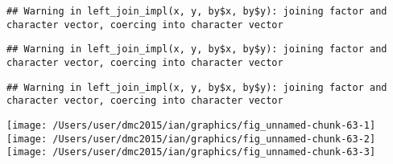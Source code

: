 \documentclass[10pt]{report}
\newenvironment{Shaded}{}{}
\newcommand{\KeywordTok}[1]{\textcolor[rgb]{0.00,0.44,0.13}{\textbf{{#1}}}}
\newcommand{\DataTypeTok}[1]{\textcolor[rgb]{0.56,0.13,0.00}{{#1}}}
\newcommand{\StringTok}[1]{\textcolor[rgb]{0.25,0.44,0.63}{{#1}}}
\newcommand{\NormalTok}[1]{{#1}}
\begin{document}
\begin{verbatim}
## Warning in left_join_impl(x, y, by$x, by$y): joining factor and character vector, coercing into character vector
\end{verbatim}

\begin{Shaded}
\end{Shaded}

\begin{verbatim}
## Warning in left_join_impl(x, y, by$x, by$y): joining factor and character vector, coercing into character vector
\end{verbatim}

\begin{verbatim}
## Warning in left_join_impl(x, y, by$x, by$y): joining factor and character vector, coercing into character vector
\end{verbatim}

\begin{Shaded}
\end{Shaded}

\begin{center}\texttt{[image: /Users/user/dmc2015/ian/graphics/fig\_unnamed-chunk-63-1]} \texttt{[image: /Users/user/dmc2015/ian/graphics/fig\_unnamed-chunk-63-2]} \texttt{[image: /Users/user/dmc2015/ian/graphics/fig\_unnamed-chunk-63-3]} \end{center}
\end{document}
